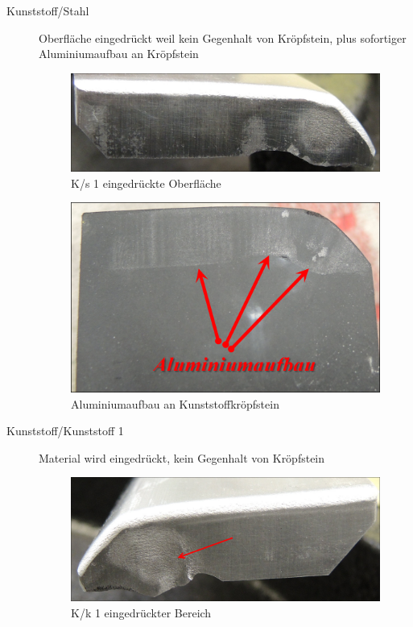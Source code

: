 \documentclass[12pt,a4paper,parskip,twoside,BCOR5mm,headsepline]{scrartcl}
\begin{document}
\begin{description*}
\begin{description}
\item[Kunststoff/Stahl] Oberfläche eingedrückt weil kein Gegenhalt von Kröpfstein, plus sofortiger Aluminiumaufbau an Kröpfstein
\begin{figure}[H]
\centering
\includegraphics[width=.8\textwidth]{Ks1}
\caption{K/s 1 eingedrückte Oberfläche}
\label{fig:Ks1}
\end{figure}
\begin{figure}[H]
\centering
\includegraphics[width=.8\textwidth]{SteinKAlubau}
\caption{Aluminiumaufbau an Kunststoffkröpfstein}
\label{fig:SteinKAlubau}
\end{figure}
\newpage

\item[Kunststoff/Kunststoff 1] Material wird eingedrückt, kein Gegenhalt von Kröpfstein
\begin{figure}[H]
\centering
\includegraphics[width=.8\textwidth]{Kk1a}
\caption{K/k 1 eingedrückter Bereich}
\label{fig:Kk}
\end{figure}



\end{description}
\end{description*}
\end{document}
